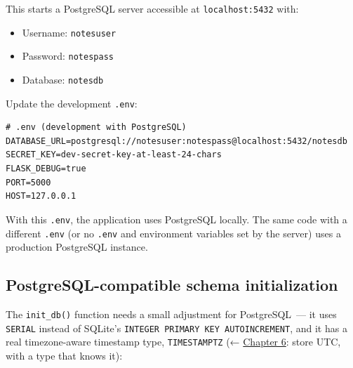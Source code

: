 \noindent{}This starts a PostgreSQL server accessible at \texttt{localhost:5432} with:

\begin{itemize}
\tightlist
\item
  Username: \texttt{notesuser}
\item
  Password: \texttt{notespass}
\item
  Database: \texttt{notesdb}
\end{itemize}

\noindent{}Update the development \texttt{.env}:

\begin{outputbox}[short]
\begin{Verbatim}[fontsize=\codesize, breaklines, breakanywhere, breaksymbolleft={\tiny\textcolor{muted}{$\hookrightarrow$}}]
# .env (development with PostgreSQL)
DATABASE_URL=postgresql://notesuser:notespass@localhost:5432/notesdb
SECRET_KEY=dev-secret-key-at-least-24-chars
FLASK_DEBUG=true
PORT=5000
HOST=127.0.0.1
\end{Verbatim}
\end{outputbox}

\noindent{}With this \texttt{.env}, the application uses PostgreSQL locally. The same code with a different \texttt{.env} (or no \texttt{.env} and environment variables set by the server) uses a production PostgreSQL instance.

\subsection*{PostgreSQL-compatible schema initialization}\label{13-configuration-externalization:postgresql-compatible-schema-initialization}

The \texttt{init\_db()} function needs a small adjustment for PostgreSQL~--- it uses \texttt{SERIAL} instead of SQLite's \texttt{INTEGER\ PRIMARY\ KEY\ AUTOINCREMENT}, and it has a real timezone-aware timestamp type, \texttt{TIMESTAMPTZ} (← \hyperref[ch:06-local-dependencies]{Chapter 6}: store UTC, with a type that knows it):

